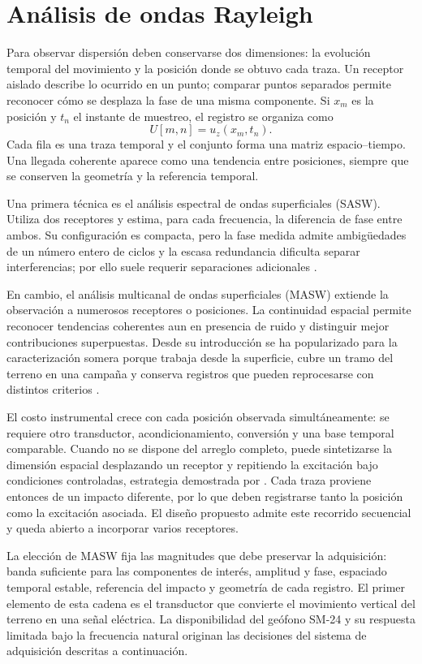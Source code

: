 \section{Análisis de ondas Rayleigh}
\label{sec:metodologia}

Para observar dispersión deben conservarse dos dimensiones: la evolución temporal del movimiento y la posición donde se obtuvo cada traza. Un receptor aislado describe lo ocurrido en un punto; comparar puntos separados permite reconocer cómo se desplaza la fase de una misma componente. Si $x_m$ es la posición y $t_n$ el instante de muestreo, el registro se organiza como
\begin{equation}
U[m,n]=u_z(x_m,t_n).
\label{eq:registro-xt}
\end{equation}
Cada fila es una traza temporal y el conjunto forma una matriz espacio--tiempo. Una llegada coherente aparece como una tendencia entre posiciones, siempre que se conserven la geometría y la referencia temporal.

Una primera técnica es el análisis espectral de ondas superficiales (SASW). Utiliza dos receptores y estima, para cada frecuencia, la diferencia de fase entre ambos. Su configuración es compacta, pero la fase medida admite ambigüedades de un número entero de ciclos y la escasa redundancia dificulta separar interferencias; por ello suele requerir separaciones adicionales \citep{Foti2014}.

En cambio, el análisis multicanal de ondas superficiales (MASW) extiende la observación a numerosos receptores o posiciones. La continuidad espacial permite reconocer tendencias coherentes aun en presencia de ruido y distinguir mejor contribuciones superpuestas. Desde su introducción se ha popularizado para la caracterización somera porque trabaja desde la superficie, cubre un tramo del terreno en una campaña y conserva registros que pueden reprocesarse con distintos criterios \citep{Park1998,Park1999,Foti2018}.

El costo instrumental crece con cada posición observada simultáneamente: se requiere otro transductor, acondicionamiento, conversión y una base temporal comparable. Cuando no se dispone del arreglo completo, puede sintetizarse la dimensión espacial desplazando un receptor y repitiendo la excitación bajo condiciones controladas, estrategia demostrada por \citet{LinAshlock2016}. Cada traza proviene entonces de un impacto diferente, por lo que deben registrarse tanto la posición como la excitación asociada. El diseño propuesto admite este recorrido secuencial y queda abierto a incorporar varios receptores.

La elección de MASW fija las magnitudes que debe preservar la adquisición: banda suficiente para las componentes de interés, amplitud y fase, espaciado temporal estable, referencia del impacto y geometría de cada registro. El primer elemento de esta cadena es el transductor que convierte el movimiento vertical del terreno en una señal eléctrica. La disponibilidad del geófono SM-24 y su respuesta limitada bajo la frecuencia natural originan las decisiones del sistema de adquisición descritas a continuación.
